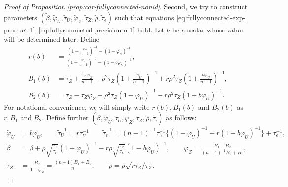 \documentclass[10pt,a4paper]{amsart}
\begin{document}
\begin{proof}[Proof of Proposition \ref{prop:car-fullyconnected-nonid}]
Second, we try to construct parameters $(\tilde\beta, \tilde\varphi_U, \tilde\tau_U, \tilde\varphi_Z, \tilde\tau_Z, \tilde\rho, \tilde\tau_\epsilon)$ such that equations \eqref{eq:fullyconnected-exp-product-1}--\eqref{eq:fullyconnected-precision-n-1} hold. 
Let $b$ be a scalar whose value will be determined later. Define 
\begin{align}
r(b) &= \frac{\left(1 + \frac{\varphi_U}{n-1} \right)^{-1} - \left(1-\varphi_U\right)^{-1}}{\left(1 + \frac{b\varphi_U}{n-1} \right)^{-1} - \left(1-b\varphi_U\right)^{-1}} 
,
\label{eq:car-full-r}
\\
\nonumber
B_1(b) & = \tau_Z + \frac{\tau_Z\varphi_Z}{n-1} - \rho^2\tau_Z\left( 1 + \frac{\varphi_U}{n-1}\right)^{-1} + r\rho^2 \tau_Z \left( 1 + \frac{b\varphi_U}{n-1}\right)^{-1},
\\
\nonumber
B_2(b) & = \tau_Z - \tau_Z \varphi_Z - \rho^2\tau_Z(1-\varphi_U)^{-1} + r\rho^2\tau_Z(1-b\varphi_U)^{-1}.
\end{align}
For notational convenience, we will simply write $r(b), B_1(b)$ and $B_2(b)$ as  $r, B_1$ and $B_2$. 
Define further $(\tilde\beta, \tilde\varphi_U, \tilde\tau_U, \tilde\varphi_Z, \tilde\tau_Z, \tilde\rho, \tilde\tau_\epsilon)$ as follows:
\begin{align}\label{eq:tilde_car_non}
    \tilde\varphi_U & = b\varphi_U, 
    \qquad 
    \tilde\tau_U^{-1} = r \tau_U^{-1}
    \qquad 
    \tilde\tau_\epsilon^{-1} = (n-1)^{-1}\tau_U^{-1}\{(1-\varphi_U)^{-1} - r(1-b\varphi_U)^{-1}\} + \tau_\epsilon^{-1}, 
    \nonumber
    \\
    \tilde\beta & = \beta + \rho\sqrt{\frac{\tau_Z}{\tau_U}}(1-\varphi_U)^{-1} - r\rho\sqrt{\frac{\tau_Z}{\tau_U}}(1-b\varphi_U)^{-1}, 
    \qquad 
    \tilde\varphi_Z = \frac{B_1 - B_2}{(n-1)^{-1}B_2 + B_1},
    \nonumber
    \\
    \tilde\tau_Z &= 
    \frac{B_2}{1-\tilde\varphi_Z}
    = 
    \frac{(n-1)B_1 + B_2}{n}, \qquad \tilde\rho = \rho\sqrt{r \tau_Z/\tilde\tau_Z}. 
\end{align}


\end{proof}
\end{document}
